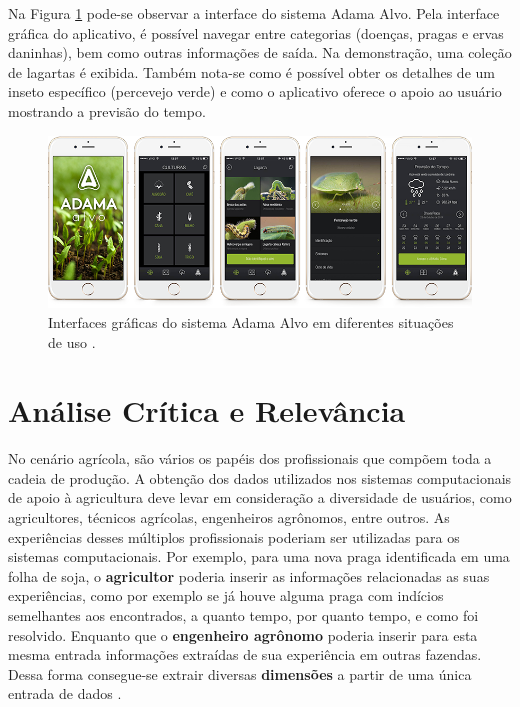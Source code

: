 \documentclass[12pt]{article}
\begin{document}
Na Figura \ref{fig:adamalvo} pode-se observar a interface do sistema Adama Alvo. Pela interface gráfica do aplicativo, é possível navegar entre categorias (doenças, pragas e ervas daninhas), bem como outras informações de saída. Na demonstração, uma coleção de lagartas é exibida. Também nota-se como é possível obter os detalhes de um inseto específico (percevejo verde) e como o aplicativo oferece o apoio ao usuário mostrando a previsão do tempo.

\begin{figure}[!htb]
	\centering
  \includegraphics[scale=0.5]{images/AdamaAlvo.png}
  \caption{Interfaces gráficas do sistema Adama Alvo em diferentes situações de uso \cite{AdamaAlvo:2020}.}
  \label{fig:adamalvo}
\end{figure}

\section{Análise Crítica e Relevância}
\label{sec:analise_critica_relevancia}

No cenário agrícola, são vários os papéis dos profissionais que compõem toda a cadeia de produção. A obtenção dos dados utilizados nos sistemas computacionais de apoio à agricultura deve levar em consideração a diversidade de usuários, como agricultores, técnicos agrícolas, engenheiros agrônomos, entre outros. As experiências desses múltiplos profissionais poderiam ser utilizadas para os sistemas computacionais. Por exemplo, para uma nova praga identificada em uma folha de soja, o \textbf{agricultor} poderia inserir as informações relacionadas as suas experiências, como por exemplo se já houve alguma praga com indícios semelhantes aos encontrados, a quanto tempo, por quanto tempo, e como foi resolvido. Enquanto que o \textbf{engenheiro agrônomo} poderia inserir para esta mesma entrada informações extraídas de sua experiência em outras fazendas. Dessa forma consegue-se extrair diversas \textbf{dimensões} a partir de uma única entrada de dados \cite{Walling:2020}.
\end{document}

